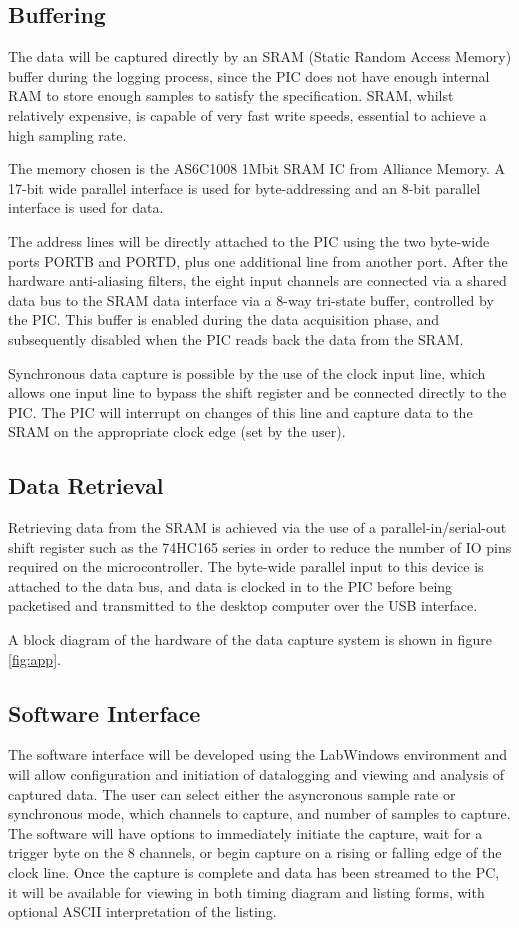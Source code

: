 \documentclass[11pt]{article}
\begin{document}
\subsection{Buffering}
    The data will be captured directly by an SRAM (Static Random Access Memory) buffer during the logging process, since the PIC does not have enough internal RAM to store enough samples to satisfy the specification. SRAM, whilst relatively expensive, is capable of very fast write speeds, essential to achieve a high sampling rate.

    The memory chosen is the AS6C1008 1Mbit SRAM IC from Alliance Memory. A 17-bit wide parallel interface is used for byte-addressing and an 8-bit parallel interface is used for data.

    The address lines will be directly attached to the PIC using the two byte-wide ports PORTB and PORTD, plus one additional line from another port. After the hardware anti-aliasing filters, the eight input channels are connected via a shared data bus to the SRAM data interface via a 8-way tri-state buffer, controlled by the PIC. This buffer is enabled during the data acquisition phase, and subsequently disabled when the PIC reads back the data from the SRAM.

    Synchronous data capture is possible by the use of the clock input line, which allows one input line to bypass the shift register and be connected directly to the PIC.  The PIC will interrupt on changes of this line and capture data to the SRAM on the appropriate clock edge (set by the user).

\subsection{Data Retrieval}
    Retrieving data from the SRAM is achieved via the use of a parallel-in/serial-out shift register such as the 74HC165 series in order to reduce the number of IO pins required on the microcontroller. The byte-wide parallel input to this device is attached to the data bus, and data is clocked in to the PIC before being packetised and transmitted to the desktop computer over the USB interface.

    A block diagram of the hardware of the data capture system is shown in figure \ref{fig:app}.
    
\subsection{Software Interface}
    The software interface will be developed using the LabWindows environment and will allow configuration and initiation of datalogging and viewing and analysis of captured data.  The user can select either the asyncronous sample rate or synchronous mode, which channels to capture, and number of samples to capture.  The software will have options to immediately initiate the capture, wait for a trigger byte on the 8 channels, or begin capture on a rising or falling edge of the clock line.  Once the capture is complete and data has been streamed to the PC, it will be available for viewing in both timing diagram and listing forms, with optional ASCII interpretation of the listing.
    
\end{document}
